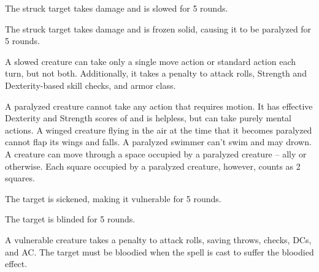 \spellrng{\rngclose}
\begin{spellhealthy}
  The struck target takes damage and is slowed for 5 rounds.
\end{spellhealthy}
\begin{spellblood}
  The struck target takes damage and is frozen solid, causing it to be paralyzed for 5 rounds.
\end{spellblood}
\begin{spellnotes}
   A slowed creature can take only a single move action or standard action each turn, but not both. Additionally, it takes a  penalty to attack rolls, Strength and Dexterity-based skill checks, and armor class.

   A paralyzed creature cannot take any action that requires motion. It has effective Dexterity and Strength scores of  and is helpless, but can take purely mental actions. A winged creature flying in the air at the time that it becomes paralyzed cannot flap its wings and falls. A paralyzed swimmer can't swim and may drown. A creature can move through a space occupied by a paralyzed creature -- ally or otherwise. Each square occupied by a paralyzed creature, however, counts as 2 squares.
 \end{spellnotes}

\spellrng{\rngclose}
\begin{spellhealthy}
  The target is sickened, making it vulnerable for 5 rounds.
\end{spellhealthy}
\begin{spellblood}
  The target is blinded for 5 rounds.
\end{spellblood}
\begin{spellnotes}
  A vulnerable creature takes a  penalty to attack rolls, saving throws, checks, DCs, and AC.
  The target must be bloodied when the spell is cast to suffer the bloodied effect.
\end{spellnotes}

